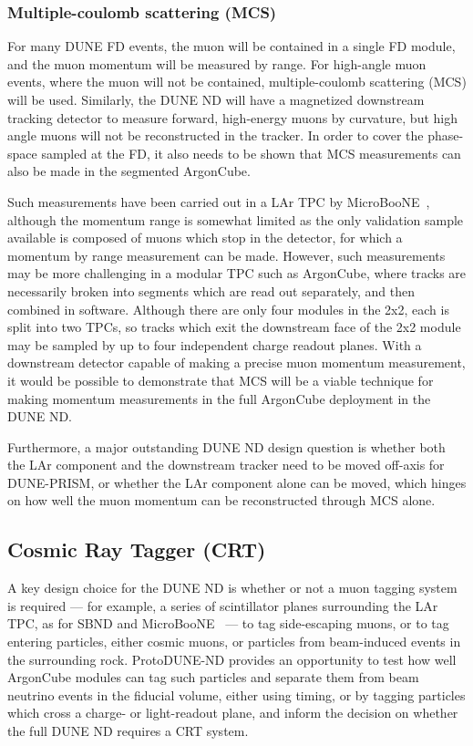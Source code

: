 \subsubsection{Multiple-coulomb scattering (MCS)}
For many DUNE FD events, the muon will be contained in a single FD module, and the muon momentum will be measured by range. For high-angle muon events, where the muon will not be contained, multiple-coulomb scattering (MCS) will be used. Similarly, the DUNE ND will have a magnetized downstream tracking detector to measure forward, high-energy muons by curvature, but high angle muons will not be reconstructed in the tracker. In order to cover the phase-space sampled at the FD, it also needs to be shown that MCS measurements can also be made in the segmented ArgonCube.

Such measurements have been carried out in a LAr TPC by MicroBooNE~\cite{Abratenko:2017nki}, although the momentum range is somewhat limited as the only validation sample available is composed of muons which stop in the detector, for which a momentum by range measurement can be made. However, such measurements may be more challenging in a modular TPC such as ArgonCube, where tracks are necessarily broken into segments which are read out separately, and then combined in software. Although there are only four modules in the 2x2, each is split into two TPCs, so tracks which exit the downstream face of the 2x2 module may be sampled by up to four independent charge readout planes. With a downstream detector capable of making a precise muon momentum measurement, it would be possible to demonstrate that MCS will be a viable technique for making momentum measurements in the full ArgonCube deployment in the DUNE ND.

Furthermore, a major outstanding DUNE ND design question is whether both the LAr component and the downstream tracker need to be moved off-axis for DUNE-PRISM, or whether the LAr component alone can be moved, which hinges on how well the muon momentum can be reconstructed through MCS alone.

\subsection{Cosmic Ray Tagger (CRT)}
A key design choice for the DUNE ND is whether or not a muon tagging system is required --- for example, a series of scintillator planes surrounding the LAr TPC, as for SBND and MicroBooNE~\cite{CRT} --- to tag side-escaping muons, or to tag entering particles, either cosmic muons, or particles from beam-induced events in the surrounding rock. ProtoDUNE-ND provides an opportunity to test how well ArgonCube modules can tag such particles and separate them from beam neutrino events in the fiducial volume, either using timing, or by tagging particles which cross a charge- or light-readout plane, and inform the decision on whether the full DUNE ND requires a CRT system.


